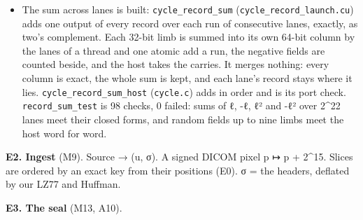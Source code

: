 \begin{itemize}
\item The sum across lanes is built: \texttt{cycle\_\allowbreak{}record\_\allowbreak{}sum} (\texttt{cycle\_\allowbreak{}record\_\allowbreak{}launch.\allowbreak{}cu}) adds one output of every record over each run of consecutive lanes, exactly, as two's complement. Each 32-bit limb is summed into its own 64-bit column by the lanes of a thread and one atomic add a run, the negative fields are counted beside, and the host takes the carries. It merges nothing: every column is exact, the whole sum is kept, and each lane's record stays where it lies. \texttt{cycle\_\allowbreak{}record\_\allowbreak{}sum\_\allowbreak{}host} (\texttt{cycle.\allowbreak{}c}) adds in order and is its port check. \texttt{record\_\allowbreak{}sum\_\allowbreak{}test} is 98 checks, 0 failed: sums of ℓ, -ℓ, ℓ² and -ℓ² over 2\textasciicircum{}22 lanes meet their closed forms, and random fields up to nine limbs meet the host word for word.
\end{itemize}

\textbf{E2. Ingest} (M9). Source → (u, σ). A signed DICOM pixel p ↦ p + 2\textasciicircum{}15. Slices are ordered by an exact key from their positions (E0). σ = the headers, deflated by our LZ77 and Huffman.

\textbf{E3. The seal} (M13, A10).

